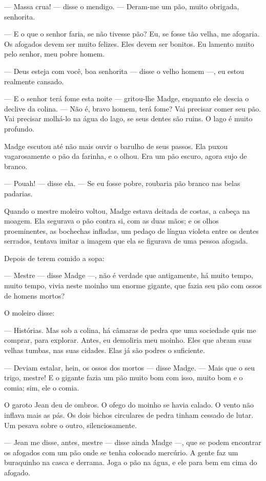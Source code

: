 --- Massa crua! --- disse o mendigo. --- Deram-me um pão, muito obrigada,
senhorita.

--- E o que o senhor faria, se não tivesse pão? Eu, se fosse tão velha,
me afogaria. Os afogados devem ser muito felizes. Eles devem ser bonitos.
Eu lamento muito pelo senhor, meu pobre homem.

--- Deus esteja com você, boa senhorita --- disse o velho homem ---, eu estou
realmente cansado.

--- E o senhor terá fome esta noite --- gritou-lhe Madge, enquanto ele
descia o declive da colina. --- Não é, bravo homem, terá fome? Vai precisar
comer seu pão. Vai precisar molhá-lo na água do lago, se seus dentes são
ruins. O lago é muito profundo.

Madge escutou até não mais ouvir o barulho de seus passos. Ela puxou
vagarosamente o pão da farinha, e o olhou. Era um pão escuro,
agora sujo de branco.

--- Pouah! --- disse ela. --- Se eu fosse pobre, roubaria pão branco nas belas
padarias.

Quando o mestre moleiro voltou, Madge estava deitada de costas, a
cabeça na moagem. Ela segurava o pão contra si, com as duas mãos; e os
olhos proeminentes, as bochechas infladas, um pedaço de língua violeta
entre os dentes serrados, tentava imitar a imagem que ela se figurava de
uma pessoa afogada.

Depois de terem comido a sopa:

--- Mestre --- disse Madge ---, não é verdade que antigamente, há muito tempo,
muito tempo, vivia neste moinho um enorme gigante, que fazia seu pão com
ossos de homens mortos?

O moleiro disse:

--- Histórias. Mas sob a colina, há câmaras de pedra que uma sociedade
quis me comprar, para explorar. Antes, eu demoliria meu moinho. Eles que
abram suas velhas tumbas, nas suas cidades. Elas já são podres o
suficiente.

--- Deviam estalar, hein, os ossos dos mortos --- disse Madge. --- Mais que o
seu trigo, mestre! E o gigante fazia um pão muito bom com isso, muito bom
e o comia; sim, ele o comia.

O garoto Jean deu de ombros. O ofego do moinho se havia calado. O
vento não inflava mais as pás. Os dois bichos circulares de pedra tinham
cessado de lutar. Um pesava sobre o outro, silenciosamente.

--- Jean me disse, antes, mestre --- disse ainda Madge ---, que se podem
encontrar os afogados com um pão onde se tenha colocado mercúrio. A gente
faz um buraquinho na casca e derrama. Joga o pão na água, e ele para
bem em cima do afogado.

